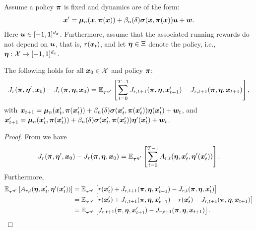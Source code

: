 Assume a policy ${\bm{\pi}}$ is fixed and dynamics are of the form:
\begin{equation}
    {\bm{x}}' = {\bm{\mu}}_n({\bm{x}}, {\bm{\pi}}({\bm{x}})) + \beta_n(\delta) {\bm{\sigma}}({\bm{x}}, {\bm{\pi}}({\bm{x}})){\bm{u}} + {\bm{w}}.
\end{equation}
Here ${\bm{u}} \in [-1, 1]^{d_x}$. Furthermore, assume that the associated running rewards do not depend on ${\bm{u}}$, that is, $r({\bm{x}}_t)$, and let ${\bm{\eta}} \in \Xi$ denote the policy, i.e., ${\bm{\eta}}: {\mathcal{X}} \to [-1, 1]^{d_x}$.
\begin{corollary}
The following holds for all ${\bm{x}}_0 \in {\mathcal{X}}$ and policy ${\bm{\pi}}$:
\begin{equation*}
    J_r ({\bm{\pi}}, {\bm{\eta}}', {\bm{x}}_0) -  J_r ({\bm{\pi}}, {\bm{\eta}}, {\bm{x}}_0) = \mathbb{E}_{{\bm{\tau}}^{{\bm{\eta}}'}}  \left[\sum^{T-1}_{t=0} J_{r, t+1}({\bm{\pi}}, {\bm{\eta}}, {\bm{x}}'_{t+1}) -  J_{r, t+1}({\bm{\pi}}, {\bm{\eta}}, {\bm{x}}_{t+1})\right],
\end{equation*}
with ${\bm{x}}_{t+1} = {\bm{\mu}}_n({\bm{x}}'_t, {\bm{\pi}}({\bm{x}}'_t)) + \beta_n(\delta) {\bm{\sigma}}({\bm{x}}'_t, {\bm{\pi}}({\bm{x}}'_t)){\bm{\eta}}({\bm{x}}'_t) + {\bm{w}}_t$, and ${\bm{x}}'_{t+1} = {\bm{\mu}}_n({\bm{x}}'_t, {\bm{\pi}}({\bm{x}}'_t)) + \beta_n(\delta) {\bm{\sigma}}({\bm{x}}'_t, {\bm{\pi}}({\bm{x}}'_t)){\bm{\eta}}'({\bm{x}}'_t) + {\bm{w}}_t$.
\label{cor:Difference in hallucinated policy}
\end{corollary}
\begin{proof}
    From  we have
    \begin{equation*}
    J_r ({\bm{\pi}}, {\bm{\eta}}', {\bm{x}}_0) -  J_r ({\bm{\pi}}, {\bm{\eta}}, {\bm{x}}_0) = \mathbb{E}_{{\bm{\tau}}^{{\bm{\eta}}'}}  \left[\sum^{T-1}_{t=0} A_{r, t}({\bm{\eta}}, {\bm{x}}'_{t}, {\bm{\eta}}'({\bm{x}}'_t))\right].
\end{equation*}
Furthermore, 
\begin{align*}
    \mathbb{E}_{{\bm{\tau}}^{{\bm{\eta}}'}}\left[A_{r, t}({\bm{\eta}}, {\bm{x}}'_{t}, {\bm{\eta}}'({\bm{x}}'_t))\right] &= \mathbb{E}_{{\bm{\tau}}^{{\bm{\eta}}'}} \left[r({\bm{x}}'_t) + J_{r, t+1}({\bm{\pi}}, {\bm{\eta}}, {\bm{x}}'_{t+1}) - J_{r, t}({\bm{\pi}}, {\bm{\eta}}, {\bm{x}}'_{t})\right] \\
    &= \mathbb{E}_{{\bm{\tau}}^{{\bm{\eta}}'}} \left[r({\bm{x}}'_t) + J_{r, t+1}({\bm{\pi}}, {\bm{\eta}}, {\bm{x}}'_{t+1}) - r({\bm{x}}'_t) - J_{r, t+1}({\bm{\pi}}, {\bm{\eta}}, {\bm{x}}_{t+1})\right] \\
    &= \mathbb{E}_{{\bm{\tau}}^{{\bm{\eta}}'}}\left[J_{r, t+1}({\bm{\pi}}, {\bm{\eta}}, {\bm{x}}'_{t+1}) - J_{r, t+1}({\bm{\pi}}, {\bm{\eta}}, {\bm{x}}_{t+1})\right].
\end{align*}
\end{proof}

